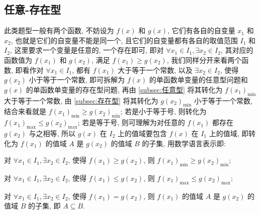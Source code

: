 \subsection{任意-存在型}\label{subsec:2.4任意-存在型}
此类题型一般有两个函数, 不妨设为 \(f(x)\) 和 \(g(x)\), 它们有各自的自变量 \({x}_{1}\) 和 \({x}_{2}\), 也就是它们的自变量不能是同一个, 且它们的自变量都有各自的取值范围 \({I}_{1}\) 和 \({I}_{2}\), 这里要求一个变量是任意的, 一个存在即可, 即对 \(\forall {x}_{1} \in  {I}_{1}, \exists {x}_{2} \in  {I}_{2}\), 其对应的函数值为 \(f\left( {x}_{1}\right)\) 和 \(g\left( {x}_{2}\right)\), 满足 \(f\left( {x}_{1}\right)  \geq  g\left( {x}_{2}\right)\), 我们同样分开来看两个函数, 即看作对 \(\forall {x}_{1} \in  {I}_{1}\), 都有 \(f\left( {x}_{1}\right)\) 大于等于一个常数, 以及 \(\exists {x}_{2} \in  {I}_{2}\), 使得 \(g\left( {x}_{2}\right)\) 小于等于一个常数, 即可拆解为 \(f(x)\) 的单函数单变量的任意型问题和 \(g(x)\) 的单函数单变量的存在型问题, 再由 \ref{subsec:任意型} 将其转化为 \(f{\left( {x}_{1}\right) }_{\min }\) 大于等于一个常数, 由 \ref{subsec:存在型} 将其转化为 \(g{\left( {x}_{2}\right) }_{\min }\) 小于等于一个常数, 结合来看就是 \(f{\left( {x}_{1}\right) }_{\min } \geq  g{\left( {x}_{2}\right) }_{\min }\); 若是小于等于号, 则转化为 \(f{\left( {x}_{1}\right) }_{\max } \leq  g{\left( {x}_{2}\right) }_{\max }\); 若是等于号, 则可理解为对任意的 \(f\left( {x}_{1}\right)\) 都存在 \(g\left( {x}_{2}\right)\) 与之相等, 所以 \(g(x)\) 在 \({I}_{2}\) 上的值域要包含 \(f(x)\) 在 \({I}_{1}\) 上的值域, 即转化为 \(f\left( {x}_{1}\right)\) 的值域 \(A\) 是 \(g\left( {x}_{2}\right)\) 的值域 \(B\) 的子集, 用数学语言表示即:

\begin{type}\label{type:17}
  对 \(\forall {x}_{1} \in  {I}_{1}, \exists {x}_{2} \in  {I}_{2}\), 使得 \(f\left( {x}_{1}\right)  \geq  g\left( {x}_{2}\right)\), 则 \(f{\left( {x}_{1}\right) }_{\min } \geq  g{\left( {x}_{2}\right) }_{\min }\);
\end{type}

\begin{type}\label{type:18}
  对 \(\forall {x}_{1} \in  {I}_{1}, \exists {x}_{2} \in  {I}_{2}\), 使得 \(f\left( {x}_{1}\right)  \leq  g\left( {x}_{2}\right)\), 则 \(f{\left( {x}_{1}\right) }_{\max } \leq  g{\left( {x}_{2}\right) }_{\max }\);
\end{type}

\begin{type}\label{type:19}
  对 \(\forall {x}_{1} \in  {I}_{1}, \exists {x}_{2} \in  {I}_{2}\), 使得 \(f\left( {x}_{1}\right)  = g\left( {x}_{2}\right)\), 则 \(f\left( {x}_{1}\right)\) 的值域 \(A\) 是 \(g\left( {x}_{2}\right)\) 的值域 \(B\) 的子集, 即 \(A \subseteq  B\).
\end{type}

